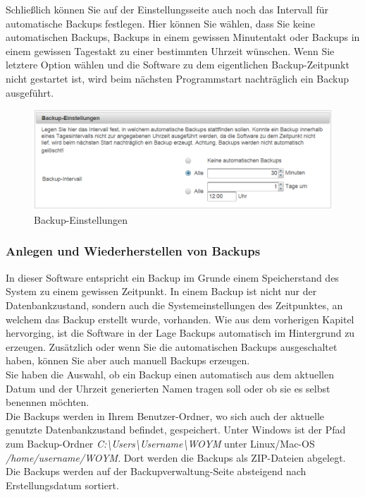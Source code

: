 \documentclass[fontsize=12pt]{scrartcl}
\begin{document}
Schließlich können Sie auf der Einstellungsseite auch noch das Intervall für automatische Backups festlegen. Hier können Sie wählen, dass Sie keine automatischen Backups, Backups in einem gewissen Minutentakt oder Backups in einem gewissen Tagestakt zu einer bestimmten Uhrzeit wünschen. Wenn Sie letztere Option wählen und die Software zu dem eigentlichen Backup-Zeitpunkt nicht gestartet ist, wird beim nächsten Programmstart nachträglich ein Backup ausgeführt.

 
\begin{figure}[H]
\includegraphics[width=\textwidth]{images/systemSettings3.png}
\caption{Backup-Einstellungen}
\end{figure}

\subsubsection{Anlegen und Wiederherstellen von Backups}

In dieser Software entspricht ein Backup im Grunde einem Speicherstand des System zu einem gewissen Zeitpunkt. In einem Backup ist nicht nur der Datenbankzustand, sondern auch die Systemeinstellungen des Zeitpunktes, an welchem das Backup erstellt wurde, vorhanden. Wie aus dem vorherigen Kapitel hervorging, ist die Software in der Lage Backups automatisch im Hintergrund zu erzeugen. Zusätzlich oder wenn Sie die automatischen Backups ausgeschaltet haben, können Sie aber auch manuell Backups erzeugen. \\
Sie haben die Auswahl, ob ein Backup einen automatisch aus dem aktuellen Datum und der Uhrzeit generierten Namen tragen soll oder ob sie es selbst benennen möchten.\\
Die Backups werden in Ihrem Benutzer-Ordner, wo sich auch der aktuelle genutzte Datenbankzustand befindet, gespeichert. Unter Windows ist der Pfad zum Backup-Ordner \textit{C:\textbackslash{}Users\textbackslash{}Username\textbackslash{}WOYM} unter Linux/Mac-OS \textit{/home/username/WOYM}. Dort werden die Backups als ZIP-Dateien abgelegt.\\
Die Backups werden auf der Backupverwaltung-Seite absteigend nach Erstellungsdatum sortiert.
\end{document}
